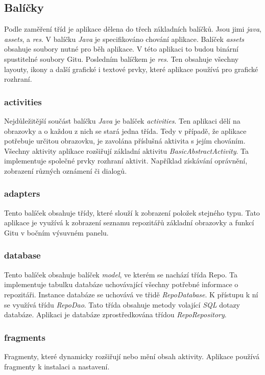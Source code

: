     \subsection{Balíčky}
    Podle zaměření tříd je aplikace dělena do třech základních balíčků. Jsou jimi \emph{java}, \emph{assets}, a \emph{res}. V balíčku \emph{Java} je specifikováno chování aplikace. Balíček \emph{assets} obsahuje soubory nutné pro běh aplikace. V této aplikaci to budou binární spustitelné soubory Gitu. Posledním balíčkem je \emph{res}. Ten obsahuje všechny layouty, ikony a další grafické i textové prvky, které aplikace používá pro grafické rozhraní.

        \subsubsection{activities}
        Nejdůležitější součást balíčku \emph{Java} je balíček \emph{activities}. Ten aplikaci dělí na obrazovky a o každou z nich se stará jedna třída. Tedy v případě, že aplikace potřebuje určitou obrazovku, je zavolána příslušná aktivita s jejím chováním. Všechny aktivity aplikace rozšiřují základní aktivitu \emph{BasicAbstractActivity}. Ta implementuje společné prvky rozhraní aktivit. Například získávání oprávnění, zobrazení různých oznámení či dialogů.

        \subsubsection{adapters}
        Tento balíček obsahuje třídy, které slouží k zobrazení položek stejného typu. Tato aplikace je využívá k zobrazení seznamu repozitářů základní obrazovky a funkcí Gitu v bočním výsuvném panelu.  

        \subsubsection{database}
        Tento balíček obsahuje balíček \emph{model}, ve kterém se nachází třída Repo. Ta implementuje tabulku databáze uchovávající všechny potřebné informace o repozitáři. Instance databáze se uchovává ve třidě \emph{RepoDatabase}. K přístupu k ní se využívá třídu \emph{RepoDao}. Tato třída obsahuje metody volající \emph{SQL} dotazy databáze. Aplikaci je databáze zprostředkována třídou \emph{RepoRepository}.

        \subsubsection{fragments}
        Fragmenty, které dynamicky rozšiřují nebo mění obsah aktivity. Aplikace používá fragmenty k instalaci a nastavení.

